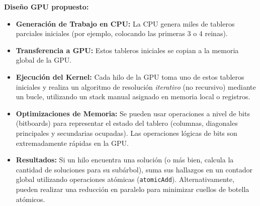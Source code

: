 \documentclass{article}
\begin{document}
\textbf{Diseño GPU propuesto:}
\begin{itemize}
    \item \textbf{Generación de Trabajo en CPU:} La CPU genera miles de tableros parciales iniciales (por ejemplo, colocando las primeras 3 o 4 reinas).
    \item \textbf{Transferencia a GPU:} Estos tableros iniciales se copian a la memoria global de la GPU.
    \item \textbf{Ejecución del Kernel:} Cada hilo de la GPU toma uno de estos tableros iniciales y realiza un algoritmo de resolución \textit{iterativo} (no recursivo) mediante un bucle, utilizando un stack manual asignado en memoria local o registros.
    \item \textbf{Optimizaciones de Memoria:} Se pueden usar operaciones a nivel de bits (bitboards) para representar el estado del tablero (columnas, diagonales principales y secundarias ocupadas). Las operaciones lógicas de bits son extremadamente rápidas en la GPU.
    \item \textbf{Resultados:} Si un hilo encuentra una solución (o más bien, calcula la cantidad de soluciones para su subárbol), suma sus hallazgos en un contador global utilizando operaciones atómicas (\texttt{atomicAdd}). Alternativamente, pueden realizar una reducción en paralelo para minimizar cuellos de botella atómicos.
\end{itemize}
\end{document}

